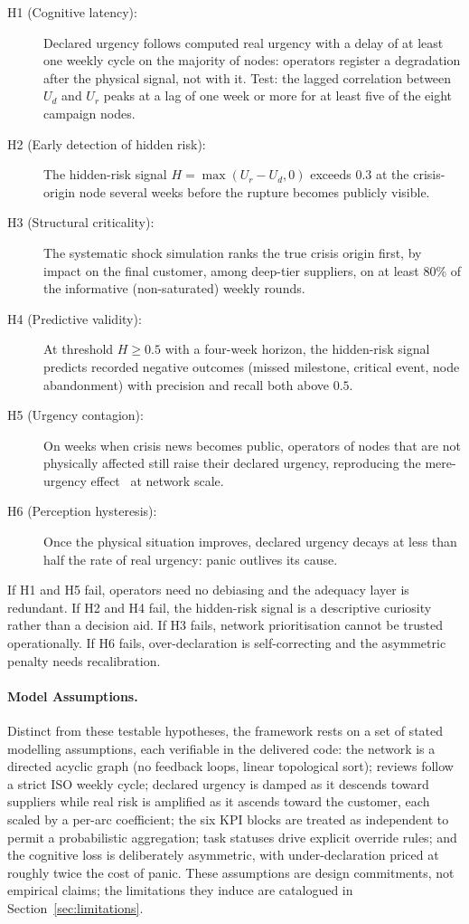 \begin{description}
    \item[H1 (Cognitive latency):] Declared urgency follows computed real urgency with a delay of at least one weekly cycle on the majority of nodes: operators register a degradation after the physical signal, not with it. Test: the lagged correlation between $U_d$ and $U_r$ peaks at a lag of one week or more for at least five of the eight campaign nodes.
    \item[H2 (Early detection of hidden risk):] The hidden-risk signal $H = \max(U_r - U_d, 0)$ exceeds $0.3$ at the crisis-origin node several weeks before the rupture becomes publicly visible.
    \item[H3 (Structural criticality):] The systematic shock simulation ranks the true crisis origin first, by impact on the final customer, among deep-tier suppliers, on at least 80\% of the informative (non-saturated) weekly rounds.
    \item[H4 (Predictive validity):] At threshold $H \ge 0.5$ with a four-week horizon, the hidden-risk signal predicts recorded negative outcomes (missed milestone, critical event, node abandonment) with precision and recall both above $0.5$.
    \item[H5 (Urgency contagion):] On weeks when crisis news becomes public, operators of nodes that are not physically affected still raise their declared urgency, reproducing the mere-urgency effect~\autocite{zhu2018mere} at network scale.
    \item[H6 (Perception hysteresis):] Once the physical situation improves, declared urgency decays at less than half the rate of real urgency: panic outlives its cause.
\end{description}

If H1 and H5 fail, operators need no debiasing and the adequacy layer is redundant. If H2 and H4 fail, the hidden-risk signal is a descriptive curiosity rather than a decision aid. If H3 fails, network prioritisation cannot be trusted operationally. If H6 fails, over-declaration is self-correcting and the asymmetric penalty needs recalibration.

\paragraph{Model Assumptions.}
Distinct from these testable hypotheses, the framework rests on a set of stated modelling assumptions, each verifiable in the delivered code: the network is a directed acyclic graph (no feedback loops, linear topological sort); reviews follow a strict ISO weekly cycle; declared urgency is damped as it descends toward suppliers while real risk is amplified as it ascends toward the customer, each scaled by a per-arc coefficient; the six KPI blocks are treated as independent to permit a probabilistic aggregation; task statuses drive explicit override rules; and the cognitive loss is deliberately asymmetric, with under-declaration priced at roughly twice the cost of panic. These assumptions are design commitments, not empirical claims; the limitations they induce are catalogued in Section~\ref{sec:limitations}.

